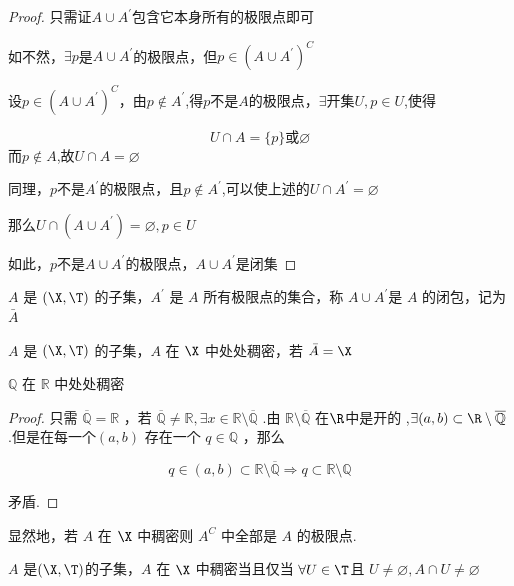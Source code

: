 \begin{proof}
	只需证$A\cup A^{\prime}$包含它本身所有的极限点即可
	
	如不然，$\exists p$是$A\cup A^{\prime}$的极限点，但$p\in(A\cup A^{\prime})^C$
	
	设$p\in(A\cup A^{\prime})^C$，由$p\notin A^{\prime}$,得$p$不是$A$的极限点，$\exists$开集$U,p\in U$,使得
	
	\[U\cap A=\{p\}\text{或}\varnothing\]
	而$p\notin A$,故$U\cap A=\varnothing$
	
	同理，$p$不是$A^{\prime}$的极限点，且$p\notin A^{\prime}$,可以使上述的$U\cap A^{\prime}=\varnothing$
	
	那么$U\cap(A\cup A^{\prime})=\varnothing,p\in U$
	
	如此，$p$不是$A\cup A^{\prime}$的极限点，$A\cup A^{\prime}$是闭集
\end{proof}
\begin{definition}
	$A$ 是 $(\X, \T)$ 的子集，$A^{\prime}$ 是 $A$ 所有极限点的集合，称 $A \cup A^{\prime}$是 $A$ 的闭包，记为 $\bar{A}$
	
	
\end{definition}
\begin{definition}
	$A$ 是 $(\X, \T)$ 的子集，$A$ 在 $\X$ 中处处稠密，若 $\bar{A}=\X$
\end{definition}
\begin{proposition}
	$\mathbb{Q}$ 在 $\mathbb{R}$ 中处处稠密
	
\end{proposition}
\begin{proof}
	只需 $\overline{\mathbb{Q}}=\mathbb{R}$ ，若 $\overline{\mathbb{Q}} \neq \mathbb{R}, \exists x \in \mathbb{R}\setminus \overline{\mathbb{Q}}$ .由 $\mathbb{R}\setminus \overline{\mathbb{Q}}$ 在$\R$中是开的 ,$\exists(a, b) \subset \R\setminus \overline{\mathbb{Q}}$ .但是在每一个$(a, b)$ 存在一个 $ q \in \mathbb{Q}$ ，那么
	
	$$
	q \in(a, b) \subset \mathbb{R}\setminus \overline{\mathbb{Q}} \Rightarrow q \subset \mathbb{R}\setminus \mathbb{Q}
	$$
	
	
	矛盾.
\end{proof}
显然地，若 $A$ 在 $\X$ 中稠密则 $A^C$ 中全部是 $A$ 的极限点.
\begin{proposition}
	$A$ 是$(\X,\T)$的子集，$A$ 在 $\X$ 中稠密当且仅当 $\forall U \in \T$且 $U\neq \varnothing, A \cap U \neq \varnothing$
\end{proposition}

